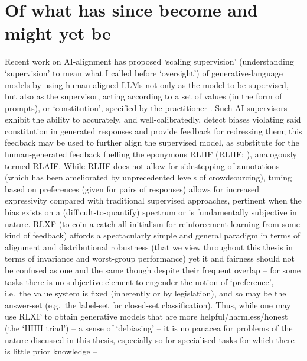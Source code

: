 \section*{Of what has since become and might yet be}\label{sec:what-might-yet-be}
%
%
Recent work on AI-alignment has proposed `scaling supervision' (understanding `supervision' to mean
what I called before `oversight') of generative-language models by using human-aligned LLMs not
only as the model-to be-supervised, but also as the supervisor, acting according to a set of values
(in the form of prompts), or `constitution', specified by the practitioner
\citep{bowman2022measuring, bai2022constitutional}.
%
Such AI supervisors exhibit the ability to accurately, and well-calibratedly, detect biases
violating said constitution in generated responses and provide feedback for redressing them; this
feedback may be used to further align the supervised model, as substitute for the human-generated
feedback fuelling the eponymous \acl{RLHF} (\acs{RLHF}; \citealp{christiano2017deep,
    stiennon2020learning, bai2022training}), analogously termed \acf{RLAIF}.
%
While \ac{RLHF} does not allow for sidestepping of annotations (which has been ameliorated by
unprecedented levels of crowdsourcing), tuning based on preferences (given for pairs of responses)
allows for increased expressivity compared with traditional supervised approaches, pertinent when
the bias exists on a (difficult-to-quantify) spectrum or is fundamentally subjective in nature.
%
RLXF (to coin a catch-all initialism for reinforcement learning from some kind of feedback) affords
a spectacularly simple and general paradigm in terms of alignment and distributional robustness
(that we view throughout this thesis in terms of invariance and worst-group performance) yet it and
fairness should not be confused as one and the same though despite their frequent overlap -- for
some tasks there is no subjective element to engender the notion of `preference', i.e.\ the value
system is fixed (inherently or by legislation), and so may be the answer-set (e.g.\ the label-set
for closed-set classification). 
%
Thus, while one may use RLXF to obtain generative models that are more helpful/harmless/honest (the
`HHH triad') -- a sense of `debiasing' -- it is no panacea for problems of the nature discussed in
this thesis, especially so for specialised tasks for which there is little prior knowledge --
